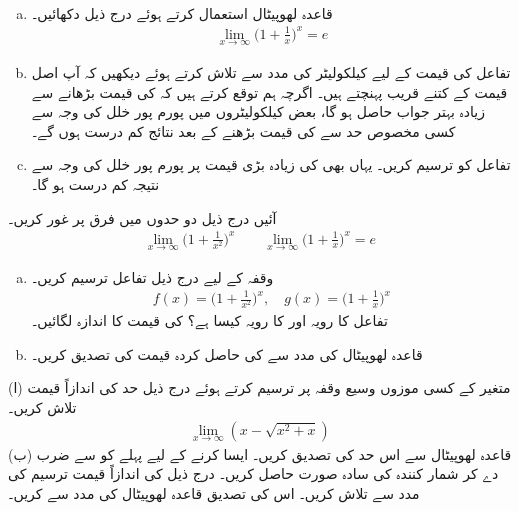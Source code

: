 \\
\begin{enumerate}[a.]
\item
قاعدہ لھوپیٹال استعمال کرتے ہوئے درج ذیل دکھائیں۔
\begin{align*}
\lim_{x\to\infty}\big(1+\frac{1}{x}\big)^x=e
\end{align*}
\item
تفاعل  کی قیمت  کے لیے کیلکولیٹر کی مدد سے تلاش کرتے ہوئے دیکھیں کہ آپ اصل قیمت  کے کتنے قریب پہنچتے ہیں۔ اگرچہ ہم توقع کرتے ہیں کہ  کی قیمت بڑھانے سے زیادہ بہتر جواب حاصل ہو گا، بعض کیلکولیٹروں  میں پورم پور خلل کی وجہ سے کسی مخصوص حد سے  کی قیمت بڑھنے  کے بعد نتائج کم درست ہوں گے۔
\item
تفاعل  کو ترسیم کریں۔ یہاں بھی  کی زیادہ بڑی قیمت پر پورم پور خلل کی وجہ سے نتیجہ کم درست ہو گا۔
\end{enumerate}
آئیں درج ذیل دو حدوں  میں فرق پر غور کریں۔
\begin{align*}
\lim_{x\to\infty}\big(1+\frac{1}{x^2}\big)^x\quad \text{}\quad \lim_{x\to \infty}\big(1+\frac{1}{x}\big)^x=e
\end{align*}
\begin{enumerate}[a.]
\item
وقفہ  کے لیے درج ذیل تفاعل ترسیم کریں۔
\begin{align*}
f(x)=\big(1+\frac{1}{x^2}\big)^x,\quad g(x)=\big(1+\frac{1}{x}\big)^x
\end{align*}
 تفاعل  کا رویہ  اور  کا رویہ کیسا ہے؟  کی قیمت کا اندازہ لگائیں۔
\item
قاعدہ لھوپیٹال کی مدد سے  کی حاصل کردہ قیمت کی تصدیق کریں۔
\end{enumerate}
(ا) متغیر  کے کسی موزوں  وسیع وقفہ پر ترسیم کرتے ہوئے درج ذیل حد کی اندازاً قیمت تلاش کریں۔
\begin{align*}
\lim_{x\to \infty}(x-\sqrt{x^2+x})
\end{align*}
(ب) قاعدہ لھوپیٹال سے اس حد کی تصدیق کریں۔ ایسا کرنے کے لیے پہلے  کو  سے ضرب دے کر شمار کنندہ  کی سادہ صورت حاصل کریں۔
درج ذیل کی اندازاً قیمت ترسیم کی مدد سے تلاش کریں۔ اس کی تصدیق قاعدہ لھوپیٹال کی مدد سے کریں۔
